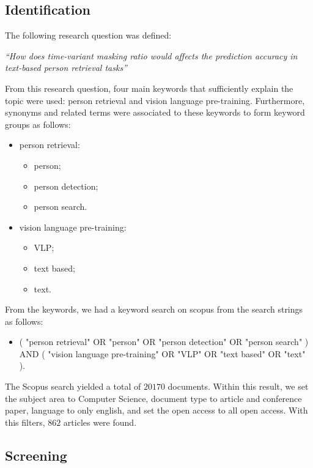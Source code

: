 \subsection*{Identification}

The following research question was defined:

\bigskip
\textit{``How does time-variant masking ratio would affects the prediction accuracy in text-based person retrieval tasks''}
\bigskip

From this research question, four main keywords that sufficiently explain the topic were used: person retrieval and vision language pre-training.
Furthermore, synonyms and related terms were associated to these keywords to form keyword groups as follows:

\begin{itemize}
    \item person retrieval:
    \begin{itemize}
        \item person;
        \item person detection;
        \item person search.
    \end{itemize}
    \item vision language pre-training:
    \begin{itemize}
        \item VLP;
        \item text based;
        \item text.
    \end{itemize}
\end{itemize}


From the keywords, we had a keyword search on scopus from the search strings as follows:

\begin{itemize}
    \item ( "person retrieval" OR "person" OR "person detection" OR "person search" ) AND ( "vision language pre-training" OR "VLP" OR "text based" OR "text" ).
\end{itemize}

The Scopus search yielded a total of $20170$ documents. Within this result, we set the subject area to Computer Science, document type to article and conference paper, language to only english, and set the open access to all open access. With this filters, $862$ articles were found. 

\subsection{Screening}

